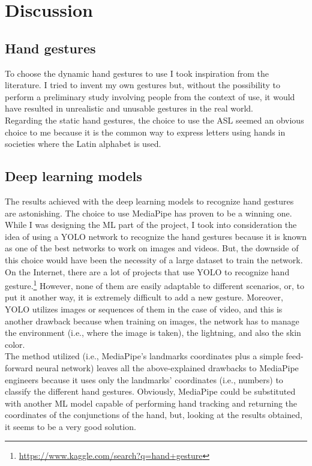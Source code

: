 \documentclass[../thesis.tex]{subfiles}
\begin{document}
\chapter{Discussion}\label{cap:discussion}

\section{Hand gestures}
To choose the dynamic hand gestures to use I took inspiration from the literature. I tried to invent my own gestures but, without the possibility to perform a preliminary study involving people from the context of use, it would have resulted in unrealistic and unusable gestures in the real world.\\

Regarding the static hand gestures, the choice to use the \acrshort{ASL} seemed an obvious choice to me because it is the common way to express letters using hands in societies where the Latin alphabet is used.

\section{Deep learning models}
The results achieved with the deep learning models to recognize hand gestures are astonishing. The choice to use MediaPipe has proven to be a winning one. While I was designing the \acrshort{ML} part of the project, I took into consideration the idea of using a YOLO network to recognize the hand gestures because it is known as one of the best networks to work on images and videos. But, the downside of this choice would have been the necessity of a large dataset to train the network. On the Internet, there are a lot of projects that use YOLO to recognize hand gesture.\footnote{\href{https://www.kaggle.com/search?q=hand+gesture}{https://www.kaggle.com/search?q=hand+gesture}} However, none of them are easily adaptable to different scenarios, or, to put it another way, it is extremely difficult to add a new gesture. Moreover, YOLO utilizes images or sequences of them in the case of video, and this is another drawback because when training on images, the network has to manage the environment (i.e., where the image is taken), the lightning, and also the skin color.\\

The method utilized (i.e., MediaPipe's landmarks coordinates plus a simple feed-forward neural network) leaves all the above-explained drawbacks to MediaPipe engineers because it uses only the landmarks' coordinates (i.e., numbers) to classify the different hand gestures. Obviously, MediaPipe could be substituted with another \acrshort{ML} model capable of performing hand tracking and returning the coordinates of the conjunctions of the hand, but, looking at the results obtained, it seems to be a very good solution.
\end{document}
